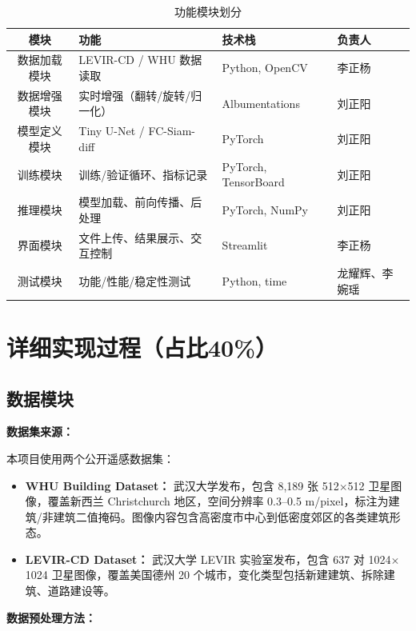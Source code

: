 \documentclass[12pt,a4paper]{article}
\begin{document}
\begin{table}[H]
\centering
\caption{功能模块划分}
\label{tab:modules}
\begin{tabular}{clll}
\toprule
模块 & 功能 & 技术栈 & 负责人 \\
\midrule
数据加载模块 & LEVIR-CD / WHU 数据读取 & Python, OpenCV & 李正杨 \\
数据增强模块 & 实时增强（翻转/旋转/归一化） & Albumentations & 刘正阳 \\
模型定义模块 & Tiny U-Net / FC-Siam-diff & PyTorch & 刘正阳 \\
训练模块 & 训练/验证循环、指标记录 & PyTorch, TensorBoard & 刘正阳 \\
推理模块 & 模型加载、前向传播、后处理 & PyTorch, NumPy & 刘正阳 \\
界面模块 & 文件上传、结果展示、交互控制 & Streamlit & 李正杨 \\
测试模块 & 功能/性能/稳定性测试 & Python, time & 龙耀辉、李婉瑶 \\
\bottomrule
\end{tabular}
\end{table}

\section{详细实现过程（占比40\%）}

\subsection{数据模块}

\textbf{数据集来源：}

本项目使用两个公开遥感数据集：

\begin{itemize}
    \item \textbf{WHU Building Dataset：} 武汉大学发布，包含 8,189 张 512$\times$512 卫星图像，覆盖新西兰 Christchurch 地区，空间分辨率 0.3--0.5 m/pixel，标注为建筑/非建筑二值掩码。图像内容包含高密度市中心到低密度郊区的各类建筑形态。
    \item \textbf{LEVIR-CD Dataset：} 武汉大学 LEVIR 实验室发布，包含 637 对 1024$\times$1024 卫星图像，覆盖美国德州 20 个城市，变化类型包括新建建筑、拆除建筑、道路建设等。
\end{itemize}

\textbf{数据预处理方法：}
\end{document}
